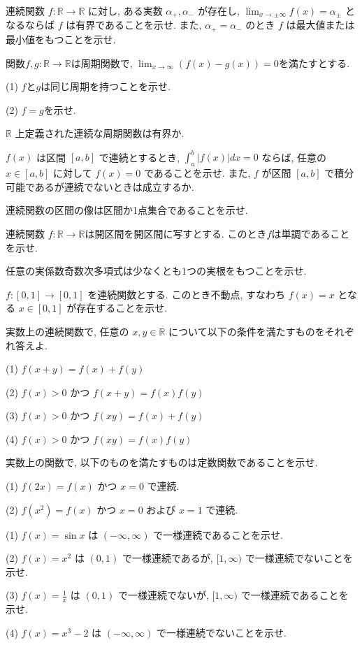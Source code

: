 \documentclass[dvipdfmx,11pt]{jsarticle}
\newcommand{\dsp}{\displaystyle}
\newcommand{\prob}{\vspace{2mm}\pro}
\theoremstyle{definition}
\numberwithin{equation}{section}
\begin{document}
\prob 連続関数 $f : \mathbb{R}\rightarrow \mathbb{R}$ に対し, ある実数 $\alpha_+ , \alpha_-$ が存在し, $\dsp \lim_{x\rightarrow\pm\infty}f(x)=\alpha_\pm$ となるならば $f$ は有界であることを示せ. また, $\alpha_+=\alpha_-$ のとき $f$ は最大値または最小値をもつことを示せ.

\prob 関数$f, g :\mathbb{R}\rightarrow\mathbb{R}$は周期関数で, $\dsp\lim_{x\rightarrow\infty}(f(x)-g(x))=0$を満たすとする.

(1) $f$と$g$は同じ周期を持つことを示せ.

(2) $f=g$を示せ.

\prob $\mathbb{R}$ 上定義された連続な周期関数は有界か.

\prob $f(x)$ は区間 $[a , b]$ で連続とするとき, $\dsp\int_{a}^{b}|f(x)|dx=0$ ならば, 任意の $x\in [a , b]$ に対して $f(x)=0$ であることを示せ. また, $f$ が区間 $[a , b]$ で積分可能であるが連続でないときは成立するか.
		
\prob 連続関数の区間の像は区間か1点集合であることを示せ.

\prob 連続関数 $f : \mathbb{R}\rightarrow \mathbb{R}$は開区間を開区間に写すとする. このとき$f$は単調であることを示せ.
		
\prob 任意の実係数奇数次多項式は少なくとも1つの実根をもつことを示せ.
		
\prob $f : [0 , 1]\rightarrow [0 , 1]$ を連続関数とする. このとき不動点, すなわち $f(x)=x$ となる $x\in [0 , 1]$ が存在することを示せ.

\prob 実数上の連続関数で, 任意の $x , y\in\mathbb{R}$ について以下の条件を満たすものをそれぞれ答えよ.
	
(1) $f(x+y)=f(x)+f(y)$
	
(2) $f(x)>0$ かつ $f(x+y)=f(x)f(y)$
	
(3) $f(x)>0$ かつ $f(xy)=f(x)+f(y)$
	
(4) $f(x)>0$ かつ $f(xy)=f(x)f(y)$

\prob 実数上の関数で, 以下のものを満たすものは定数関数であることを示せ.
	
(1) $f(2x)=f(x)$ かつ $x=0$ で連続.
	
(2) $f(x^2)=f(x)$ かつ $x=0$ および $x=1$ で連続.

\prob 
(1) $f(x)=\sin x$ は $(-\infty , \infty)$ で一様連続であることを示せ.

(2) $f(x)=x^2$ は $(0 , 1)$ で一様連続であるが, $[1 , \infty)$ で一様連続でないことを示せ.
	
(3) $\dsp f(x)=\frac{1}{x}$ は $(0 , 1)$ で一様連続でないが, $[1 , \infty)$ で一様連続であることを示せ.
	
(4) $f(x)=x^3-2$ は $(-\infty , \infty)$ で一様連続でないことを示せ.
\end{document}
